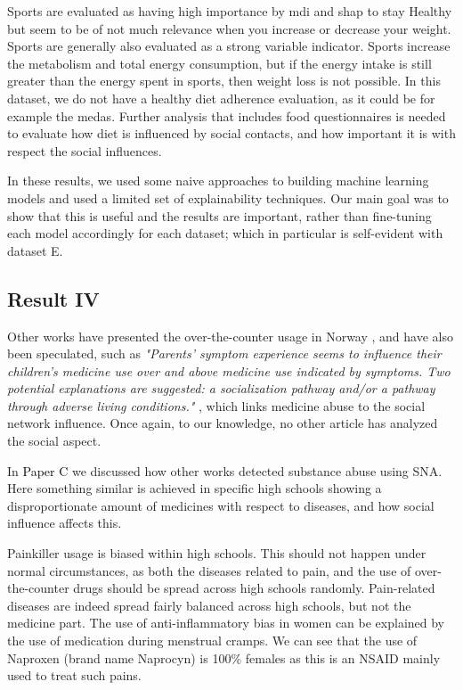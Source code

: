 Sports are evaluated as having high importance by \gls{mdi} and \gls{shap} to stay Healthy but seem to be of not much relevance when you increase or decrease your weight. Sports are generally also evaluated as a strong variable indicator. Sports increase the metabolism and total energy consumption, but if the energy intake is still greater than the energy spent in sports, then weight loss is not possible. In this dataset, we do not have a healthy diet adherence evaluation, as it could be for example the \gls{medas}. Further analysis that includes food questionnaires is needed to evaluate how diet is influenced by social contacts, and how important it is with respect the social influences. 

In these results, we used some naive approaches to building machine learning models and used a limited set of explainability techniques. Our main goal was to show that this is useful and the results are important, rather than fine-tuning each model accordingly for each dataset; which in particular is self-evident with dataset E.

\subsection{Result IV}


Other works have presented the over-the-counter usage in Norway \cite{Lorentzen2018}, and have also been speculated, such as \textit{"Parents’ symptom experience seems to influence their children’s medicine use over and above medicine use indicated by symptoms. Two potential explanations are suggested: a socialization pathway and/or a pathway through adverse living conditions."} \cite{Andersen2011}, which links medicine abuse to the social network influence. Once again, to our knowledge, no other article has analyzed the social aspect.


In \colorbox{PaperColor}{\textcolor{black}{Paper C}} we discussed how other works detected substance abuse using SNA. Here something similar is achieved in specific high schools showing a disproportionate amount of medicines with respect to diseases, and how social influence affects this.


Painkiller usage is biased within high schools. This should not happen under normal circumstances, as both the diseases related to pain, and the use of over-the-counter drugs should be spread across high schools randomly. Pain-related diseases are indeed spread fairly balanced across high schools, but not the medicine part. The use of anti-inflammatory bias in women can be explained by the use of medication during menstrual cramps. We can see that the use of Naproxen (brand name Naprocyn) is 100\% females as this is an NSAID mainly used to treat such pains.

